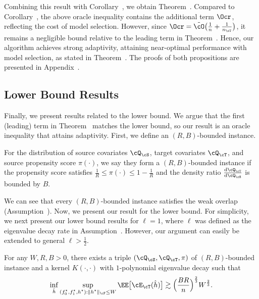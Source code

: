 \documentclass[12pt,a4paper,pdftex,onepage]{article}
\newcommand{\de}{\mathrm{d}}
\begin{document}
Combining this result with Corollary~, we obtain Theorem~. Compared to Corollary~, the above oracle inequality contains the additional term \(\Ocr\), reflecting the cost of model selection. 
However, since \(\Ocr = \tilde{\cO}\bigl(\frac{1}{n} + \frac{1}{n_\cT}\bigr)\), it remains a negligible bound relative to the leading term in Theorem~.
Hence, our algorithm achieves strong adaptivity, attaining near-optimal performance with model selection, as stated in Theorem~.
The proofs of both propositions are presented in Appendix~.


\subsection{Lower Bound Results}\label{subsection; lower bound}
Finally, we present results related to the lower bound. 
We argue that the first (leading) term in Theorem~ matches the lower bound, so our result is an oracle inequality that attains adaptivity.
First, we define an \((R,B)\)-bounded instance.


\begin{definition}
For the distribution of source covariates \(\cQ_\cS\), target covariates \(\cQ_\cT\), and source propensity score \(\pi(\cdot)\), we say they form a \((R,B)\)-bounded instance if the propensity score satisfies \(\frac{1}{R} \leq \pi(\cdot)\leq 1-\frac{1}{R}\) and the density ratio \(\frac{\de \cQ_\cT}{\de \cQ_\cS}\) is bounded by \(B\).
\end{definition}

We can see that every \((R,B)\)-bounded instance satisfies the weak overlap (Assumption~). 
Now, we present our result for the lower bound.
For simplicity, we next present our lower bound results for \(\ell=1\), where \(\ell\) was defined as the eigenvalue decay rate in
Assumption~. 
However, our argument can easily be extended to general \(\ell>\frac{1}{2}\).

\begin{theorem}\label{theorem; lower bound}
For any \(W,R,B>0\), there exists a triple \((\cQ_\cS, \cQ_\cT, \pi)\) of \((R,B)\)-bounded instance and a kernel \(K(\cdot, \cdot)\) with \(1\)-polynomial eigenvalue decay such that
\[
\inf_{\hat{h}} \sup_{\substack{(f_0^\star, f_1^\star, h^\star): \|h^\star\|_\cF \leq W}} 
\EE\bigl[\cE_\cT(\hat{h})\bigr] 
\gtrsim
\Bigl(\frac{BR}{n}\Bigr)^{\frac{2}{3}}W^{\frac{2}{3}}.
\]
\end{theorem}
\end{document}
